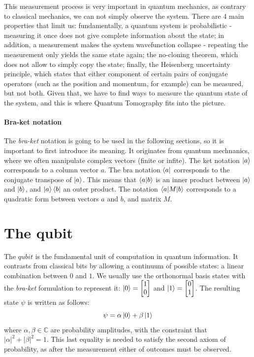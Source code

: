 \documentclass[12pt]{memoir}
\begin{document}
This measurement process is very important in quantum mechanics, as contrary to classical mechanics, we can not simply observe the system. There are 4 main properties that limit us: fundamentally, a quantum system is probabilistic - measuring it once does not give complete information about the state; in addition, a measurement makes the system wavefunction collapse - repeating the measurement only yields the same state again; the no-cloning theorem, which does not allow to simply copy the state; finally, the Heisenberg uncertainty principle, which states that either component of certain pairs of conjugate operators (such as the position and momentum, for example) can be measured, but not both. Given that, we have to find ways to measure the quantum state of the system, and this is where Quantum Tomography fits into the picture.

\paragraph*{Bra-ket notation}
The \textit{bra-ket} notation is going to be used in the following sections, so it is important to first introduce its meaning. It originates from quantum mechnanics, where we often manipulate complex vectors (finite or infite). The ket notation $\ket a$ corresponds to a column vector $a$. The
bra notation $\bra a$ corresponds to the conjugate transpose of $\ket a$. This means that $\braket{a|b}$ is an inner product between $\ket a$ and $\ket b$, and $\ket a \bra b$ an outer product. The notation $\braket{a|M|b}$ corresponds to a quadratic form between vectors $a$ and $b$, and matrix $M$.\medbreak 

\section{The qubit}\label{section:qubit}
The $qubit$ is the fundamental unit of computation in quantum information. It contrasts from classical bits by allowing a continuum of possible states: a linear combination between $0$ and $1$. We usually use the orthonormal basis states with the \textit{bra-ket} formulation to represent it: $\ket 0 = \begin{bmatrix}
    1\\
    0
\end{bmatrix}$ and $\ket 1 = \begin{bmatrix}
    0\\
    1
\end{bmatrix}$. The resulting state $\psi$ is written as follows:
\begin{equation}
    \psi = \alpha \ket 0 + \beta \ket 1 
\end{equation}
where $\alpha,\beta \in \mathbb{C}$ are probability amplitudes, with the constraint that $|\alpha|^2 + |\beta|^2 = 1$. This last equality is needed to satisfy the second axiom of probability, as after the measurement either of outcomes must be observed.\medbreak
\end{document}
